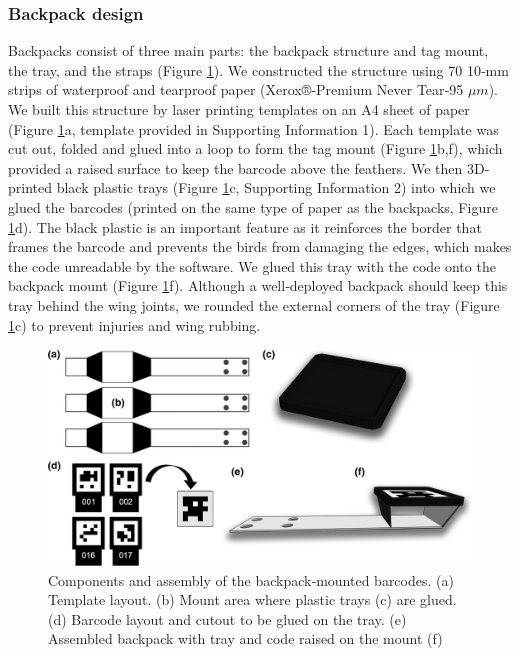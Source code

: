 \documentclass[11pt,a4paper,twoside]{book}
\begin{document}
\begin{doublespace}
\subsubsection{Backpack design}
Backpacks consist of three main parts: the backpack structure and tag mount, the tray, and the straps (Figure \ref{fig:bird_figure_1}). We constructed the structure using 70 10‐mm strips of waterproof and tearproof paper (Xerox®‐Premium Never Tear‐95 $\mu m$). We built this structure by laser printing templates on an A4 sheet of paper (Figure \ref{fig:bird_figure_1}a, template provided in Supporting Information 1). Each template was cut out, folded and glued into a loop to form the tag mount (Figure \ref{fig:bird_figure_1}b,f), which provided a raised surface to keep the barcode above the feathers. We then 3D‐printed black plastic trays (Figure \ref{fig:bird_figure_1}c, Supporting Information 2) into which we glued the barcodes (printed on the same type of paper as the backpacks, Figure \ref{fig:bird_figure_1}d). The black plastic is an important feature as it reinforces the border that frames the barcode and prevents the birds from damaging the edges, which makes the code unreadable by the software. We glued this tray with the code onto the backpack mount (Figure \ref{fig:bird_figure_1}f). Although a well‐deployed backpack should keep this tray behind the wing joints, we rounded the external corners of the tray (Figure \ref{fig:bird_figure_1}c) to prevent injuries and wing rubbing.

\begin{figure}[!htb]
    \centering
    \includegraphics{Graving_IMPRS_Thesis/figures/bird_figure_1.jpg}
    \caption{Components and assembly of the backpack‐mounted barcodes. (a) Template layout. (b) Mount area where plastic trays (c) are glued. (d) Barcode layout and cutout to be glued on the tray. (e) Assembled backpack with tray and code raised on the mount (f)}
    \label{fig:bird_figure_1}
\end{figure}



\end{doublespace}
\end{document}
